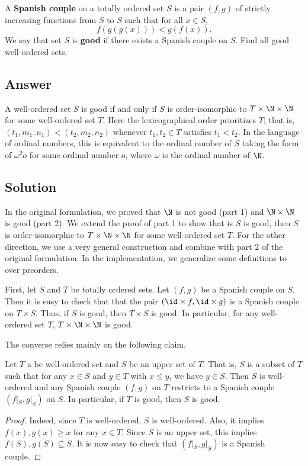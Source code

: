 A \textbf{Spanish couple} on a totally ordered set $S$ is a pair $(f, g)$ of strictly increasing functions from $S$ to $S$ such that for all $x \in S$,
\[ f(g(g(x))) < g(f(x)). \]
We say that set $S$ is \textbf{good} if there exists a Spanish couple on $S$.
Find all good well-ordered sets.



\subsection*{Answer}

A well-ordered set $S$ is good if and only if $S$ is order-isomorphic to $T \times \N \times \N$ for some well-ordered set $T$.
Here the lexicographical order prioritizes $T$; that is, $(t_1, m_1, n_1) < (t_2, m_2, n_2)$ whenever $t_1, t_2 \in T$ satisfies $t_1 < t_2$.
In the language of ordinal numbers, this is equivalent to the ordinal number of $S$ taking the form of $\omega^2 o$ for some ordinal number $o$, where $\omega$ is the ordinal number of $\N$.



\subsection*{Solution}

In the original formulation, we proved that $\N$ is not good (part 1) and $\N \times \N$ is good (part 2).
We extend the proof of part 1 to show that is $S$ is good, then $S$ is order-isomorphic to $T \times \N \times \N$ for some well-ordered set $T$.
For the other direction, we use a very general construction and combine with part 2 of the original formulation.
In the implementation, we generalize some definitions to over preorders.

First, let $S$ and $T$ be totally ordered sets.
Let $(f, g)$ be a Spanish couple on $S$.
Then it is easy to check that that the pair $(\id \times f, \id \times g)$ is a Spanish couple on $T \times S$.
Thus, if $S$ is good, then $T \times S$ is good.
In particular, for any well-ordered set $T$, $T \times \N \times \N$ is good.

The converse relies mainly on the following claim.

\begin{claim}
Let $T$ a be well-ordered set and $S$ be an upper set of $T$.
That is, $S$ is a subset of $T$ such that for any $x \in S$ and $y \in T$ with $x \leq y$, we have $y \in S$.
Then $S$ is well-ordered and any Spanish couple $(f, g)$ on $T$ restricts to a Spanish couple $(f|_S, g|_S)$ on $S$.
In particular, if $T$ is good, then $S$ is good.
\end{claim}
\begin{proof}
Indeed, since $T$ is well-ordered, $S$ is well-ordered.
Also, it implies $f(x), g(x) \geq x$ for any $x \in T$.
Since $S$ is an upper set, this implies $f(S), g(S) \subseteq S$.
It is now easy to check that $(f|_S, g|_S)$ is a Spanish couple.
\end{proof}


